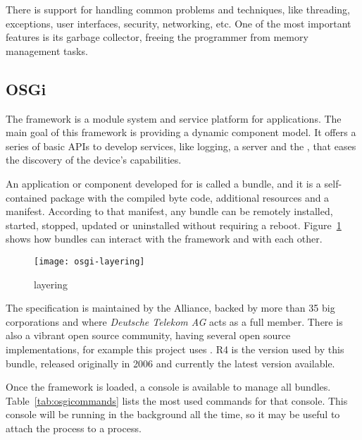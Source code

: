 There is support for handling common problems and techniques, like threading, exceptions, user interfaces, security, networking, etc.
One of the most important features is its garbage collector, freeing the programmer from memory management tasks.


\subsection{OSGi} %
\label{sub:osgi}

The  framework is a module system and service platform for  applications.
The main goal of this framework is providing a dynamic component model.
It offers a series of basic APIs to develop services, like logging, a  server and the , that eases the discovery of the device's capabilities.

An application or component developed for  is called a bundle, and it is a self-contained package with the compiled byte code, additional resources and a manifest.
According to that manifest, any bundle can be remotely installed, started, stopped, updated or uninstalled without requiring a reboot.
Figure~\ref{fig:osgi-layering} shows how bundles can interact with the framework and with each other.

\begin{figure}[htbp]
  \centering
    \texttt{[image: osgi-layering]}
  \caption{ layering}
  \label{fig:osgi-layering}
\end{figure}

The  specification is maintained by the  Alliance, backed by more than 35 big corporations and where \emph{Deutsche Telekom AG} acts as a full member.
There is also a vibrant open source community, having several open source implementations, for example this project uses  .
 R4 is the version used by this bundle, released originally in 2006 and currently the latest version available.

Once the framework is loaded, a console is available to manage all bundles.
Table~\ref{tab:osgicommands} lists the most used commands for that console.
This console will be running in the background all the time, so it may be useful to attach the process to a  process.

